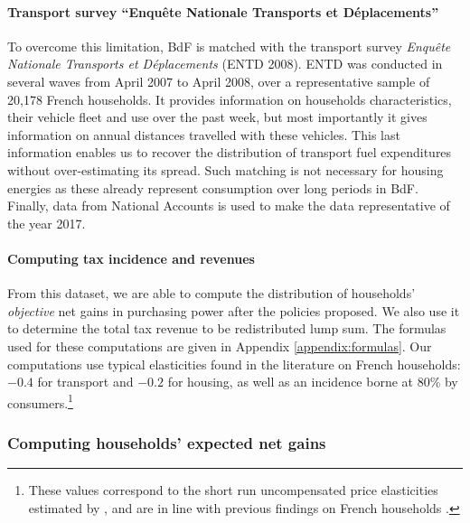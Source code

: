 \documentclass[11pt]{article}
\begin{document}
\paragraph{Transport survey ``Enquête Nationale Transports et Déplacements''}
 To overcome this limitation, BdF is matched with the transport survey \emph{Enquête Nationale Transports et Déplacements} (ENTD 2008). ENTD was conducted in several waves from April 2007 to April 2008, over a representative sample of 20,178 French households. It provides information on households characteristics, their vehicle fleet and use over the past week, but most importantly it gives information on annual distances travelled with these vehicles. This last information enables us to recover the distribution of transport fuel expenditures without over-estimating its spread. Such matching is not necessary for housing energies as these already represent consumption over long periods in BdF. Finally, data from National Accounts is used to make the data representative of the year 2017. %
 
 \paragraph{Computing tax incidence and revenues}
 
 From this dataset, we are able to compute the distribution of households' \textit{objective} net gains in purchasing power after the policies proposed. We also use it to determine the total tax revenue to be redistributed lump sum. The formulas used for these computations are given in Appendix \ref{appendix:formulas}. Our computations use typical elasticities found in the literature on French households: $-0.4$ for transport and $-0.2$ for housing, as well as an incidence borne at 80\% by consumers.\footnote{These values correspond to the short run uncompensated price elasticities estimated by \citet{douenne_vertical_2018}, and are in line with previous findings on French households \citep[e.g.][]{clerc_marcus,bureau_distributional_2011}.} 
    \subsubsection{Computing households' expected net gains\label{subsubsec:computation_feedback}}
\end{document}
